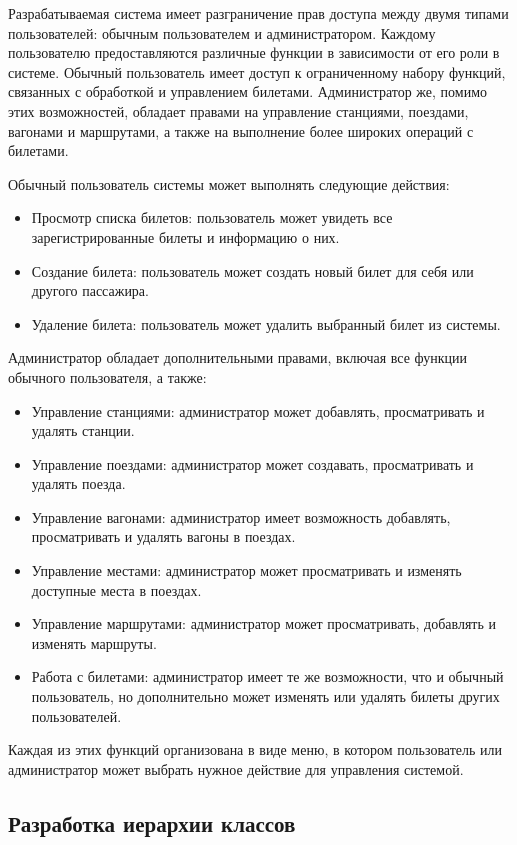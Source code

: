 Разрабатываемая система имеет разграничение прав доступа между двумя типами пользователей: обычным пользователем и администратором. Каждому пользователю предоставляются различные функции в зависимости от его роли в системе. Обычный пользователь имеет доступ к ограниченному набору функций, связанных с обработкой и управлением билетами. Администратор же, помимо этих возможностей, обладает правами на управление станциями, поездами, вагонами и маршрутами, а также на выполнение более широких операций с билетами.

Обычный пользователь системы может выполнять следующие действия:
\begin{itemize}
    \item Просмотр списка билетов: пользователь может увидеть все зарегистрированные билеты и информацию о них.
    \item Создание билета: пользователь может создать новый билет для себя или другого пассажира.
    \item Удаление билета: пользователь может удалить выбранный билет из системы.
\end{itemize}

Администратор обладает дополнительными правами, включая все функции обычного пользователя, а также:
\begin{itemize}
    \item Управление станциями: администратор может добавлять, просматривать и удалять станции.
    \item Управление поездами: администратор может создавать, просматривать и удалять поезда.
    \item Управление вагонами: администратор имеет возможность добавлять, просматривать и удалять вагоны в поездах.
    \item Управление местами: администратор может просматривать и изменять доступные места в поездах.
    \item Управление маршрутами: администратор может просматривать, добавлять и изменять маршруты.
    \item Работа с билетами: администратор имеет те же возможности, что и обычный пользователь, но дополнительно может изменять или удалять билеты других пользователей.
\end{itemize}


Каждая из этих функций организована в виде меню, в котором пользователь или администратор может выбрать нужное действие для управления системой.

\subsection{Разработка иерархии классов}

